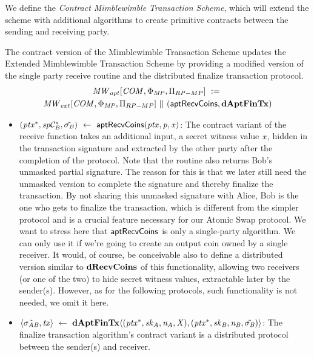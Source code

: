 We define the \emph{Contract Mimblewimble Transaction Scheme}, which will extend the scheme with additional algorithms to create primitive contracts between the sending and receiving party.

\begin{definition}
    \label{def:atom:apt-ext-mw-tx-scheme}
    The contract version of the Mimblewimble Transaction Scheme updates the Extended Mimblewimble Transaction Scheme by providing a modified version of the single party receive routine and the distributed finalize transaction protocol.
    \begin{gather*}
        \mathit{MW}_{apt}[\mathit{COM},\Phi_{\mathit{MP}},\Pi_{RP-MP}] ~:=~ \\ \mathit{MW}_{ext}[\mathit{COM},\Phi_{\mathit{MP}},\Pi_{RP-MP}] ~||~ (\mathsf{aptRecvCoins}, \mathbf{dAptFinTx})
    \end{gather*}
    \begin{itemize}
        \item $(\mathit{ptx}^*, \mathit{sp}\mathcal{C}_{\mathit{B}}^*, \tilde{\sigma_{\mathit{B}}}) ~\leftarrow~ \mathsf{aptRecvCoins}(\mathit{ptx},\mathit{p},\mathit{x})$: The contract variant of the receive function takes an additional input, a secret witness value
        $\mathit{x}$, hidden in the transaction signature and extracted by the other party after the completion of the protocol.
        Note that the routine also returns Bob's unmasked partial signature.
        The reason for this is that we later still need the unmasked version to complete the signature and thereby finalize the transaction.
        By not sharing this unmasked signature with Alice, Bob is the one who gets to finalize the transaction, which is different from the simpler protocol and is a crucial feature necessary for our Atomic Swap protocol.
        We want to stress here that $\mathsf{aptRecvCoins}$ is only a single-party algorithm.
        We can only use it if we're going to create an output coin owned by a single receiver.
        It would, of course, be conceivable also to define a distributed version similar to $\mathbf{dRecvCoins}$ of this functionality, allowing two receivers (or one of the two) to hide secret witness values, extractable later by the sender(s).
        However, as for the following protocols, such functionality is not needed, we omit it here.
        \item $\langle \tilde{\sigma_{\mathit{A}\mathit{B}}}, \mathit{tx} \rangle ~\leftarrow~ \mathbf{dAptFinTx} \langle (\mathit{ptx}^*,\mathit{sk}_{\mathit{A}},\mathit{\mathit{n}_{\mathit{A}}},\mathit{X}), (\mathit{ptx}^*,\mathit{sk}_{\mathit{B}},\mathit{\mathit{n}_{\mathit{B}}},\tilde{\sigma_{\mathit{B}}}) \rangle$: The finalize transaction algorithm's contract variant is a distributed protocol between the sender(s) and receiver.

\end{itemize}
\end{definition}
